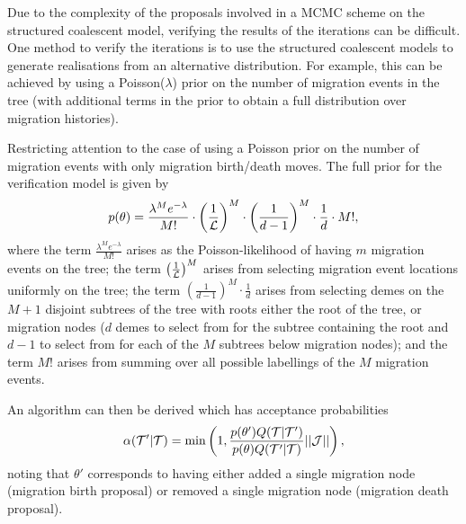 Due to the complexity of the proposals involved in a MCMC scheme on the structured coalescent model, verifying the results of the iterations can be difficult. One method to verify the iterations is to use the structured coalescent models to generate realisations from an alternative distribution. For example, this can be achieved by using a Poisson($\lambda$) prior on the number of migration events in the tree (with additional terms in the prior to obtain a full distribution over migration histories).

Restricting attention to the case of using a Poisson prior on the number of migration events with only migration birth/death moves. The full prior for the verification model is given by
\[
p(\theta) = \frac{\lambda^M e^{-\lambda}}{M!} \cdot \left( \frac{1}{\mathcal{L}} \right)^M \cdot \left( \frac{1}{d-1} \right)^M \cdot \frac{1}{d} \cdot M!,
\]
where the term $\frac{\lambda^M e^{-\lambda}}{M!}$ arises as the Poisson-likelihood of having $m$ migration events on the tree; the term $\left( \frac{1}{\mathcal{L}} \right)^M$ arises from selecting migration event locations uniformly on the tree; the term $\left( \frac{1}{d-1} \right)^M \cdot \frac{1}{d}$ arises from selecting demes on the $M+1$ disjoint subtrees of the tree with roots either the root of the tree, or migration nodes ($d$ demes to select from for the subtree containing the root and $d-1$ to select from for each of the $M$ subtrees below migration nodes); and the term $M!$ arises from summing over all possible labellings of the $M$ migration events.

An algorithm can then be derived which has acceptance probabilities
\[
\alpha (\mathcal{T}' | \mathcal{T}) = \min \left(1, \frac{p(\theta') Q(\mathcal{T} | \mathcal{T}')}{p(\theta) Q(\mathcal{T}' | \mathcal{T})} || \mathcal{J} ||\right),
\]
noting that $\theta'$ corresponds to having either added a single migration node (migration birth proposal) or removed a single migration node (migration death proposal).

